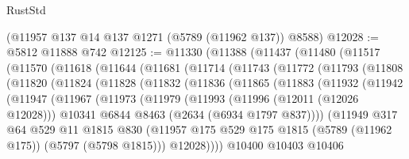 \begin{lexlean}{RustStd}
\begin{coremodule}
    (@11957 @137 @14 @137 @1271 (@5789 (@11962 @137)) @8588)
@12028 := @5812 @11888 @742
@12125 := @11330
    (@11388
      (@11437
        (@11480
          (@11517
            (@11570
              (@11618
                (@11644
                  (@11681
                    (@11714
                      (@11743
                        (@11772
                          (@11793
                            (@11808
                              (@11820
                                (@11824
                                  (@11828
                                    (@11832
                                      (@11836
                                        (@11865
                                          (@11883
                                            (@11932
                                              (@11942
                                                (@11947
                                                  (@11967
                                                    (@11973
                                                      (@11979
                                                        (@11993
                                                          (@11996 (@12011 (@12026 @12028)))
                                                          @10341
                                                          @6844
                                                          @8463
                                                          (@2634 (@6934 @1797 @837))))
                                                      (@11949
                                                        @317
                                                        @64
                                                        @529
                                                        @11
                                                        @1815
                                                        @830
                                                        (@11957
                                                          @175
                                                          @529
                                                          @175
                                                          @1815
                                                          (@5789 (@11962 @175))
                                                          (@5797 (@5798 @1815)))
                                                        @12028))))
                                                @10400
                                                @10403
                                                @10406

\end{coremodule}
\end{lexlean}
